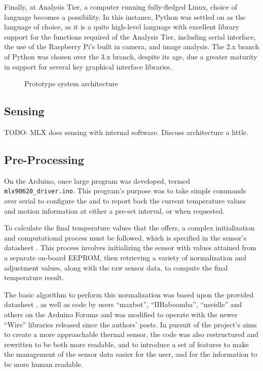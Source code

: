 \documentclass[../thesis/thesis.tex]{subfiles}
\begin{document}
Finally, at Analysis Tier, a computer running fully-fledged Linux, choice of language becomes a possibility. In this instance, Python was settled on as the language of choice, as it is a quite high-level language with excellent library support for the functions required of the Analysis Tier, including serial interface, the use of the Raspberry Pi's built in camera, and image analysis. The 2.x branch of Python was chosen over the 3.x branch, despite its age, due a greater maturity in support for several key graphical interface libraries.

\begin{figure}
\centering

\caption{Prototype system architecture}
\label{fig:pictures:protob-arch}
\end{figure}

\subsection{Sensing}
TODO: MLX does sensing with internal software. Discuss architecture a little.

\subsection{Pre-Processing}

On the Arduino, once large program was developed, termed \texttt{mlx90620\_driver.ino}. This program's purpose was to take simple commands over serial to configure the \mlx and to report back the current temperature values and \pir motion information at either a pre-set interval, or when requested.

To calculate the final temperature values that the \mlx offers, a complex initialization and computational process must be followed, which is specified in the sensor's datasheet \cite{MLXDatasheet}. This process involves initializing the sensor with values attained from a separate on-board \iic EEPROM, then retrieving a variety of normalization and adjustment values, along with the raw sensor data, to compute the final temperature result.

The basic algorithm to perform this normalization was based upon the provided datasheet \cite{MLXDatasheet}, as well as code by users ``maxbot'', ``IIBaboomba'', ``nseidle'' and others on the Arduino Forums \cite{ArduinoForum} and was modified to operate with the newer \ard ``Wire'' \iic libraries released since the authors' posts. In pursuit of the project's aims to create a more approachable thermal sensor, the code was also restructured and rewritten to be both more readable, and to introduce a set of features to make the management of the sensor data easier for the user, and for the information to be more human readable.
\end{document}
